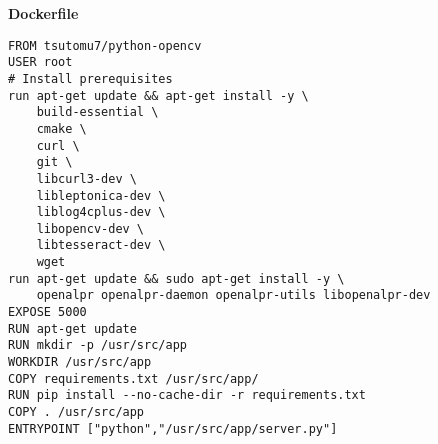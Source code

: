 { \sffamily \textbf{Dockerfile}}
\vspace{0.1cm}
\begin{mdframed}[linecolor=black, topline=true, bottomline=true,
  leftline=false, rightline=false, backgroundcolor=LightGray,userdefinedwidth=\textwidth]
\begin{verbatim}
FROM tsutomu7/python-opencv
USER root
# Install prerequisites
run apt-get update && apt-get install -y \
    build-essential \
    cmake \
    curl \
    git \
    libcurl3-dev \
    libleptonica-dev \
    liblog4cplus-dev \
    libopencv-dev \
    libtesseract-dev \
    wget
run apt-get update && sudo apt-get install -y \
    openalpr openalpr-daemon openalpr-utils libopenalpr-dev
EXPOSE 5000
RUN apt-get update
RUN mkdir -p /usr/src/app
WORKDIR /usr/src/app
COPY requirements.txt /usr/src/app/
RUN pip install --no-cache-dir -r requirements.txt
COPY . /usr/src/app
ENTRYPOINT ["python","/usr/src/app/server.py"]
\end{verbatim}
\end{mdframed}


